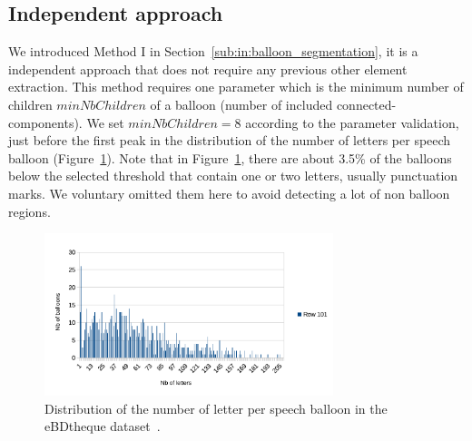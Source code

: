 

\subsection{Independent approach} %

We introduced Method I in Section~\ref{sub:in:balloon_segmentation}, it is a independent approach that does not require any previous other element extraction.
This method requires one parameter which is the minimum number of children $minNbChildren$ of a balloon (number of included connected-components).
We set $minNbChildren=8$ according to the parameter validation, just before the first peak in the distribution of the number of letters per speech balloon (Figure~\ref{fig:ex:min_number_children_validation}).
Note that in Figure~\ref{fig:ex:min_number_children_validation}, there are about 3.5\% of the balloons below the selected threshold that contain one or two letters, usually punctuation marks.
We voluntary omitted them here to avoid detecting a lot of non balloon regions.

    \begin{figure}[h]%
      \centering
      \includegraphics[trim= 10px 0px 60px 0px, clip, width=0.75\textwidth]{number_of_letter_per_balloon.pdf}
      \caption[Distribution of the number of letter per speech balloon]{Distribution of the number of letter per speech balloon in the eBDtheque dataset~\cite{Guerin2013}.
      }
      \label{fig:ex:min_number_children_validation}
    \end{figure}  


